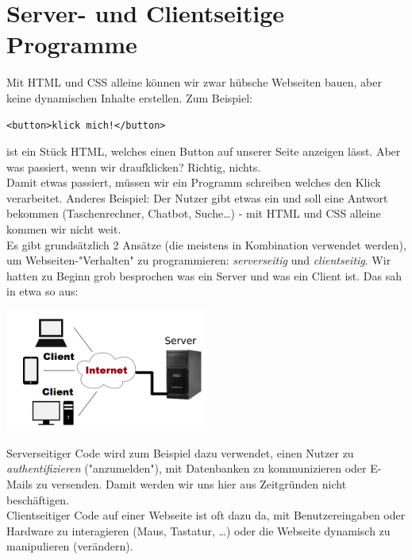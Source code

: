 \documentclass[11pt]{article}
\begin{document}
    \section{Server- und Clientseitige Programme}
    Mit HTML und CSS alleine können wir zwar hübsche Webseiten bauen, aber keine dynamischen
    Inhalte erstellen.
    Zum Beispiel:
    \begin{verbatim}<button>klick mich!</button>
    \end{verbatim}
    ist ein Stück HTML, welches einen Button auf unserer Seite anzeigen lässt.
    Aber was passiert, wenn wir draufklicken?
    Richtig, nichts. \\

    Damit etwas passiert, müssen wir ein Programm schreiben welches den Klick verarbeitet.
    Anderes Beispiel: Der Nutzer gibt etwas ein und soll eine Antwort bekommen (Taschenrechner, Chatbot, Suche\dots) -
    mit HTML und CSS alleine kommen wir nicht weit. \\

    Es gibt grundsätzlich 2 Ansätze (die meistens in Kombination verwendet werden),
    um Webseiten-"Verhalten" zu programmieren: \textit{serverseitig} und \textit{clientseitig}.
    Wir hatten zu Beginn grob besprochen was ein Server und was ein Client ist.
    Das sah in etwa so aus:

    \begin{center}
        \includegraphics[width=0.5\textwidth]{clientserver}
    \end{center}

    Serverseitiger Code wird zum Beispiel dazu verwendet, einen Nutzer zu \textit{authentifizieren} ("anzumelden"),
    mit Datenbanken zu kommunizieren oder E-Mails zu versenden.
    Damit werden wir uns hier aus Zeitgründen nicht beschäftigen. \\

    Clientseitiger Code auf einer Webseite ist oft dazu da, mit Benutzereingaben oder Hardware zu
    interagieren (Maus, Tastatur, \dots) oder die Webseite dynamisch zu manipulieren (verändern).
\end{document}
